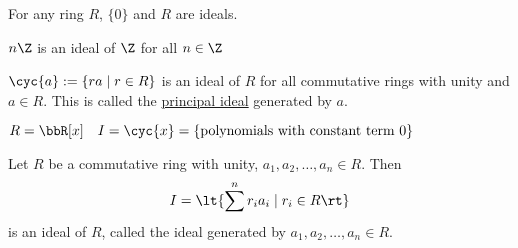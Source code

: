 \begin{example}
  For any ring \( R \), \( \{0\} \) and \( R \) are ideals.
\end{example}

\begin{example}
  \( n\Z \) is an ideal of \( \Z \) for all \( n\in\Z \)
\end{example}

\begin{example}
  \( \cyc{a}:=\{ra\mid r\in R\} \) is an ideal of \( R \) for all commutative rings with unity and \( a\in R \). This is called the \uline{principal ideal} generated by \( a \).
\end{example}

\begin{example}
  \( R=\bbR[x]\quad I=\cyc{x}= \{\text{polynomials with constant term 0}\} \)
\end{example}

\begin{example}
  Let \( R \) be a commutative ring with unity, \( a_1,a_2,\ldots,a_n\in R \). Then
  \begin{align*}
    I = \lt\{\sum^n  r_ia_i \mid r_i\in R\rt\}
  \end{align*}
  is an ideal of \( R \), called the ideal generated by \( a_1,a_2,\ldots,a_n\in R \).
\end{example}
